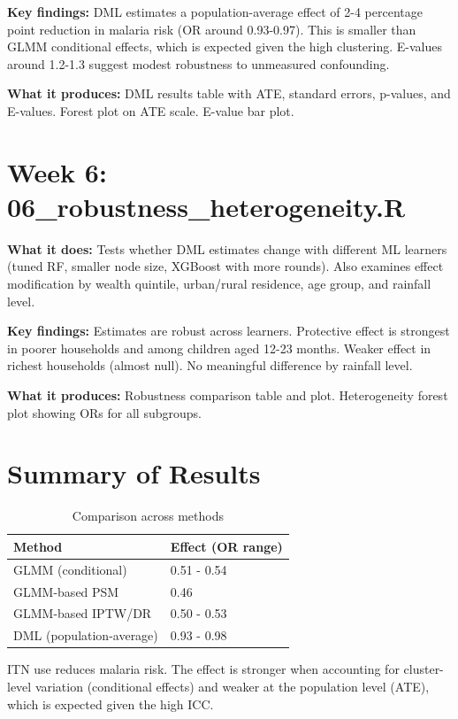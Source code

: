 \documentclass[11pt]{article}
\begin{document}
	\textbf{Key findings:} DML estimates a population-average effect of 2-4 percentage point reduction in malaria risk (OR around 0.93-0.97). This is smaller than GLMM conditional effects, which is expected given the high clustering. E-values around 1.2-1.3 suggest modest robustness to unmeasured confounding.
	
	\textbf{What it produces:} DML results table with ATE, standard errors, p-values, and E-values. Forest plot on ATE scale. E-value bar plot.
	
	\section*{Week 6: 06\_robustness\_heterogeneity.R}
	
	\textbf{What it does:} Tests whether DML estimates change with different ML learners (tuned RF, smaller node size, XGBoost with more rounds). Also examines effect modification by wealth quintile, urban/rural residence, age group, and rainfall level.
	
	\textbf{Key findings:} Estimates are robust across learners. Protective effect is strongest in poorer households and among children aged 12-23 months. Weaker effect in richest households (almost null). No meaningful difference by rainfall level.
	
	\textbf{What it produces:} Robustness comparison table and plot. Heterogeneity forest plot showing ORs for all subgroups.
	
	\section*{Summary of Results}
	
	\begin{table}[htbp]
		\centering
		\begin{tabular}{ll}
			\toprule
			\textbf{Method} & \textbf{Effect (OR range)} \\
			\midrule
			GLMM (conditional) & 0.51 - 0.54 \\
			GLMM-based PSM & 0.46 \\
			GLMM-based IPTW/DR & 0.50 - 0.53 \\
			DML (population-average) & 0.93 - 0.98 \\
			\bottomrule
		\end{tabular}
		\caption{Comparison across methods}
	\end{table}
	
	ITN use reduces malaria risk. The effect is stronger when accounting for cluster-level variation (conditional effects) and weaker at the population level (ATE), which is expected given the high ICC.
\end{document}
